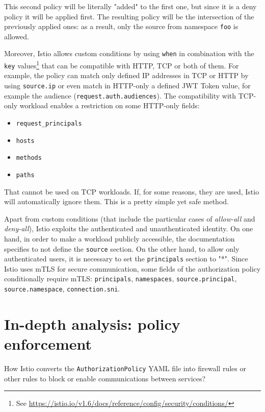 \noindent This second policy will be literally "added" to the first one, but since it is a deny policy it will be applied first. The resulting policy will be the intersection of the previously applied ones: as a result, only the source from namespace \texttt{foo} is allowed. 

Moreover, Istio allows custom conditions by using \texttt{when} in combination with the \texttt{key} values\footnote{See \url{https://istio.io/v1.6/docs/reference/config/security/conditions/}} that can be compatible with HTTP, TCP or both of them. For example, the policy can match only defined IP addresses in TCP or HTTP by using \texttt{source.ip} or even match in HTTP-only a defined JWT Token value, for example the audience (\texttt{request.auth.audiences}). The compatibility with TCP-only workload enables a restriction on some HTTP-only fields: 

\begin{itemize}
    \item \texttt{request\_principals}
    \item \texttt{hosts}
    \item \texttt{methods}
    \item \texttt{paths}
\end{itemize}

\noindent That cannot be used on TCP workloads. If, for some reasons, they are used, Istio will automatically ignore them. This is a pretty simple yet safe method.

Apart from custom conditions (that include the particular cases of \textit{allow-all} and \textit{deny-all}), Istio exploits the authenticated and unauthenticated identity. On one hand, in order to make a workload publicly accessible, the documentation specifies to not define the \texttt{source} section. On the other hand, to allow only authenticated users, it is necessary to set the \texttt{principals} section to "*". Since Istio uses mTLS for secure communication, some fields of the authorization policy conditionally require mTLS: \texttt{principals}, \texttt{namespaces}, \texttt{source.principal}, \texttt{source.namespace}, \texttt{connection.sni}.

\section{In-depth analysis: policy enforcement}
How Istio converts the \texttt{AuthorizationPolicy} YAML file into firewall rules or other rules to block or enable communications between services? 

